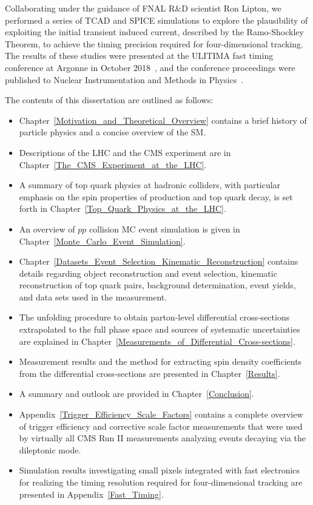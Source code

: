 \begin{refsection}
Collaborating under the guidance of FNAL R\&D scientist Ron Lipton, we performed a series of TCAD and SPICE simulations to explore the plausibility of exploiting the initial transient induced current, described by the Ramo-Shockley Theorem, to achieve the timing precision required for four-dimensional tracking.
The results of these studies were presented at the ULITIMA fast timing conference at Argonne in October 2018~\cite{ULITIMA2018}, and the conference proceedings were published to Nuclear Instrumentation and Methods in Physics~\cite{LIPTON2019162423}.

The contents of this dissertation are outlined as follows:
\begin{itemize}
    \item Chapter~\ref{Motivation_and_Theoretical_Overview} contains a brief history of particle physics and a concise overview of the SM.
    \item Descriptions of the LHC and the CMS experiment are in Chapter~\ref{The_CMS_Experiment_at_the_LHC}.
    \item A summary of top quark physics at hadronic colliders, with particular emphasis on the spin properties of \ttbar production and top quark decay, is set forth in Chapter~\ref{Top_Quark_Physics_at_the_LHC}. 
    \item An overview of $pp$ collision MC event simulation is given in Chapter~\ref{Monte_Carlo_Event_Simulation}.
    \item Chapter~\ref{Datasets_Event_Selection_Kinematic_Reconstruction} contains details regarding object reconstruction and event selection, kinematic reconstruction of top quark pairs, background determination, event yields, and data sets used in the measurement.
    \item The unfolding procedure to obtain parton-level differential cross-sections extrapolated to the full phase space and sources of systematic uncertainties are explained in Chapter~\ref{Measurements_of_Differential_Cross-sections}.
    \item Measurement results and the method for extracting spin density coefficients from the differential cross-sections are presented in Chapter~\ref{Results}.
    \item A summary and outlook are provided in Chapter~\ref{Conclusion}.
    \item Appendix~\ref{Trigger_Efficiency_Scale_Factors} contains a complete overview of trigger efficiency and corrective scale factor measurements that were used by virtually all CMS Run II measurements analyzing \ttbar events decaying via the dileptonic mode.
    \item Simulation results investigating small pixels integrated with fast electronics for realizing the timing resolution required for four-dimensional tracking are presented in Appendix~\ref{Fast_Timing}.
\end{itemize}


\clearpage
\printbibliography[heading=subbibliography,resetnumbers=true]
\end{refsection}